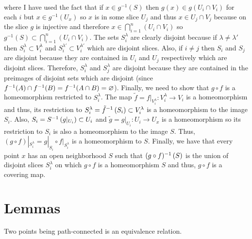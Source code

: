 \documentclass[12pt]{extarticle}
\theoremstyle{remark}
\begin{document}
where I have used the fact that if $x \in g^{-1}(S)$ then $g(x) \in g(U_i \cap V_i)$ for each $i$ but $x \in g^{-1}(U_x)$ so $x$ is in some slice $U_{j}$ and thus $x \in U_{j} \cap V_{j}$ because on the slice $g$ is injective and therefore $x \in \bigcap\limits_{i = 1}^n (U_i \cap V_i)$ so $g^{-1}(S) \subset \bigcap\limits_{i = 1}^n (U_i \cap V_i)$. The sets $S_i^\lambda$ are clearly disjoint because if $\lambda \neq \lambda'$ then $S_i^\lambda \subset V_i^\lambda$ and $S_i^{\lambda'} \subset V_i^{\lambda'}$ which are disjoint slices. Also, if $i \neq j$ then $S_i$ and $S_j$ are disjoint because they are contained in $U_i$ and $U_j$ respectively which are disjoint slices. Therefore, $S_i^\lambda$ and $S_j^\lambda$ are disjoint because they are contained in the preimages of disjoint sets which are disjoint (since $f^{-1}(A) \cap f^{-1}(B) = f^{-1}(A \cap B) = \varnothing$). Finally, we need to show that $g \circ f$ is a homeomorphism restricted to $S_i^\lambda$. The map $\tilde{f} = f|_{V_i^\lambda} : V_i^\lambda \to V_i$ is a homeomorphism and thus, its restriction to $S_i^\lambda = \tilde{f}^{-1} \left( S_i \right) \subset V_i^\lambda$ is a homeomorphism to the image $S_i$. Also, $S_i = S^{-1} \left( g|_{U_i} \right) \subset U_i$ and $\tilde{g} = g|_{U_i} : U_i \to U_x$ is a homeomorphism so its restriction to $S_i$ is also a homeomorphism to the image $S$. Thus, $(g \circ f) |_{S_i^\lambda} = g |_{S_i} \circ f|_{S_i^\lambda}$ is a homeomorphism to $S$. Finally, we have that every point $x$ has an open neighborhood $S$ such that $(g \circ f)^{-1} \left( S \right)$ is the union of disjoint slices $S_i^\lambda$ on which $g \circ f$ is a homeomorphism $S$ and thus, $g \circ f$ is a covering map.   
\section*{Lemmas}


\begin{lemma} \label{patheq}
Two points being path-connected is an equivalence relation.
\end{lemma}
\end{document}
